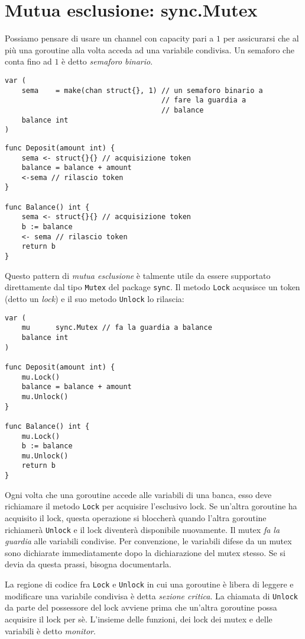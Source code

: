 \section{Mutua esclusione: sync.Mutex}
\label{sec:mutua_esclusione_syncmutex}%
Possiamo pensare di usare un channel con capacity pari a $1$ per assicurarsi che al più una goroutine alla volta acceda ad una variabile condivisa.
Un semaforo che conta fino ad $1$ è detto \textit{semaforo binario}.
\begin{lstlisting}[frame=single, label={lst:lstlisting9-2.1}]
var (
    sema    = make(chan struct{}, 1) // un semaforo binario a
                                     // fare la guardia a
                                     // balance
    balance int
)
\end{lstlisting}
\begin{lstlisting}[frame=single, label={lst:lstlisting9-2.2}]
func Deposit(amount int) {
    sema <- struct{}{} // acquisizione token
    balance = balance + amount
    <-sema // rilascio token
}

func Balance() int {
    sema <- struct{}{} // acquisizione token
    b := balance
    <- sema // rilascio token
    return b
}
\end{lstlisting}
Questo pattern di \textit{mutua esclusione} è talmente utile da essere supportato direttamente dal tipo \verb|Mutex| del package \verb|sync|.
Il metodo \verb|Lock| acqusisce un token (detto un \textit{lock}) e il suo metodo \verb|Unlock| lo rilascia:
\begin{lstlisting}[frame=single, label={lst:lstlisting9-2.3}]
var (
    mu      sync.Mutex // fa la guardia a balance
    balance int
)

func Deposit(amount int) {
    mu.Lock()
    balance = balance + amount
    mu.Unlock()
}

func Balance() int {
    mu.Lock()
    b := balance
    mu.Unlock()
    return b
}
\end{lstlisting}
Ogni volta che una goroutine accede alle variabili di una banca, esso deve richiamare il metodo \verb|Lock| per acquisire l'esclusivo lock.
Se un'altra goroutine ha acquisito il lock, questa operazione si bloccherà quando l'altra goroutine richiamerà \verb|Unlock| e il lock diventerà disponibile nuovamente.
Il mutex \textit{fa la guardia} alle variabili condivise.
Per convenzione, le variabili difese da un mutex sono dichiarate immediatamente dopo la dichiarazione del mutex stesso.
Se si devia da questa prassi, bisogna documentarla.

La regione di codice fra \verb|Lock| e \verb|Unlock| in cui una goroutine è libera di leggere e modificare una variabile condivisa è detta \textit{sezione critica}.
La chiamata di \verb|Unlock| da parte del possessore del lock avviene prima che un'altra goroutine possa acquisire il lock per sè.
L'insieme delle funzioni, dei lock dei mutex e delle variabili è detto \textit{monitor}.

